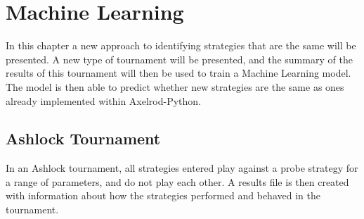
\chapter{Machine Learning}\label{cha:machinelearning}

In this chapter a new approach to identifying strategies that are the same will be presented.
A new type of tournament will be presented, and the summary of the results of this tournament will then be used to train a Machine Learning model.
The model is then able to predict whether new strategies are the same as ones already implemented within Axelrod-Python.

\section{Ashlock Tournament}\label{sec:ashlock_tourn}
In an Ashlock tournament, all strategies entered play against a probe strategy for a range of parameters, and do not play each other.
A results file is then created with information about how the strategies performed and behaved in the tournament.

